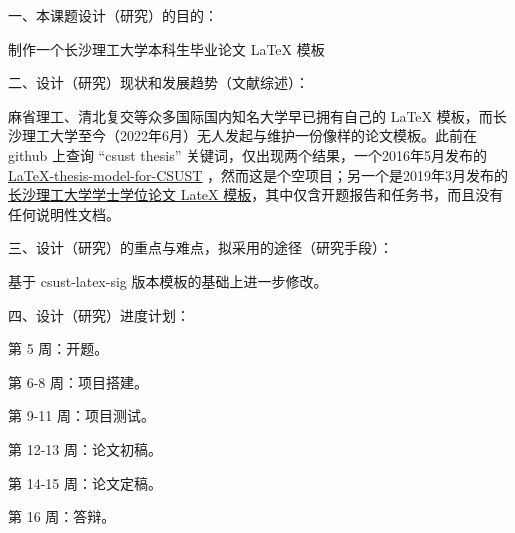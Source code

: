 \documentclass{csustThesis}
\begin{document}
\makeResearchProposalCover

\pagestyle{empty}  %

\begin{ubox}[breakable,]
\noindent 一、本课题设计（研究）的目的：

制作一个长沙理工大学本科生毕业论文 \LaTeX{} 模板

\vspace*{14\baselineskip}

\end{ubox}

\vspace{-.4\baselineskip}

\begin{ubox}
\noindent 二、设计（研究）现状和发展趋势（文献综述）：

麻省理工、清北复交等众多国际国内知名大学早已拥有自己的 \LaTeX{} 模板，而长沙理工大学至今（2022年6月）无人发起与维护一份像样的论文模板。此前在 github 上查询 “csust thesis” 关键词，仅出现两个结果，一个2016年5月发布的 \href{https://github.com/zonkisa/LaTeX-thesis-model-for-CSUST}{LaTeX-thesis-model-for-CSUST} ，然而这是个空项目；另一个是2019年3月发布的\href{https://github.com/leoppro/csust_thesis_latex}{长沙理工大学学士学位论文 LateX 模板}，其中仅含开题报告和任务书，而且没有任何说明性文档。

\vspace*{4\baselineskip}


\end{ubox}

\vspace{-.4\baselineskip}

\begin{ubox}[breakable,]
\noindent 三、设计（研究）的重点与难点，拟采用的途径（研究手段）：

基于 csust-latex-sig 版本模板的基础上进一步修改。

\vspace*{8\baselineskip}

\end{ubox}

\vspace{-\baselineskip}

\begin{ubox}
\noindent 四、设计（研究）进度计划：

第 5 周：开题。

第 6-8 周：项目搭建。

第 9-11 周：项目测试。

第 12-13 周：论文初稿。

第 14-15 周：论文定稿。

第 16 周：答辩。

\end{ubox}
\end{document}
